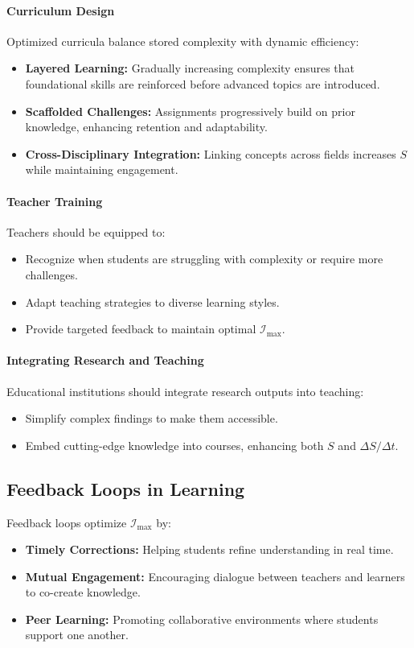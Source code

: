 \documentclass[12pt]{article}
\begin{document}
\paragraph{Curriculum Design}
Optimized curricula balance stored complexity with dynamic efficiency:
\begin{itemize}
    \item \textbf{Layered Learning:} Gradually increasing complexity ensures that foundational skills are reinforced before advanced topics are introduced.
    \item \textbf{Scaffolded Challenges:} Assignments progressively build on prior knowledge, enhancing retention and adaptability.
    \item \textbf{Cross-Disciplinary Integration:} Linking concepts across fields increases \( S \) while maintaining engagement.
\end{itemize}

\paragraph{Teacher Training}
Teachers should be equipped to:
\begin{itemize}
    \item Recognize when students are struggling with complexity or require more challenges.
    \item Adapt teaching strategies to diverse learning styles.
    \item Provide targeted feedback to maintain optimal \( \mathcal{I}_{\text{max}} \).
\end{itemize}

\paragraph{Integrating Research and Teaching}
Educational institutions should integrate research outputs into teaching:
\begin{itemize}
    \item Simplify complex findings to make them accessible.
    \item Embed cutting-edge knowledge into courses, enhancing both \( S \) and \( \Delta S / \Delta t \).
\end{itemize}

\subsection{Feedback Loops in Learning}
Feedback loops optimize \( \mathcal{I}_{\text{max}} \) by:
\begin{itemize}
    \item \textbf{Timely Corrections:} Helping students refine understanding in real time.
    \item \textbf{Mutual Engagement:} Encouraging dialogue between teachers and learners to co-create knowledge.
    \item \textbf{Peer Learning:} Promoting collaborative environments where students support one another.
\end{itemize}
\end{document}
